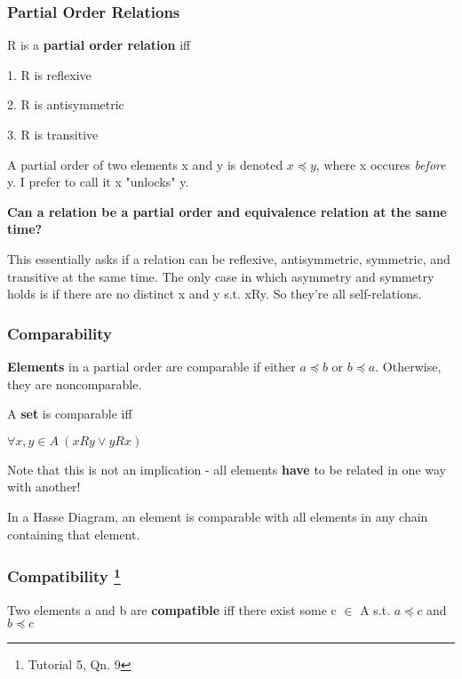\documentclass{article}
\begin{document}
\subsubsection{Partial Order Relations}
R is a \textbf{partial order relation} iff 

1. R is reflexive

2. R is antisymmetric

3. R is transitive

\vspace{10pt}

A partial order of two elements x and y is denoted $x \preccurlyeq y$, where x occures \textit{before} y. I prefer to call it x "unlocks" y.

\vspace{10pt}

\textbf{Can a relation be a partial order and equivalence relation at the same time?}

This essentially asks if a relation can be reflexive, antisymmetric, symmetric, and transitive at the same time. The only case in which asymmetry and symmetry holds is if there are no distinct x and y s.t. xRy. So they're all self-relations.

\subsubsection{Comparability}
\textbf{Elements} in a partial order are comparable if either $a \preccurlyeq b$ or $b \preccurlyeq a$. Otherwise, they are noncomparable.

\vspace{10pt}

A \textbf{set} is comparable iff
\begin{center}
    $\forall x,y \in A\ (xRy\vee yRx)$
\end{center}

Note that this is not an implication - all elements \textbf{have} to be related in one way with another!

In a Hasse Diagram, an element is comparable with all elements in any chain containing that element.

\subsubsection[Compatibility]{Compatibility \footnote{Tutorial 5, Qn. 9}}
Two elements a and b are \textbf{compatible} iff there exist some c $\in$ A s.t. $a \preccurlyeq c$ and $b \preccurlyeq c$
\end{document}
